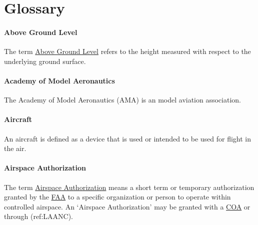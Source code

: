 \documentclass[
]{book}
\begin{document}
\hypertarget{glossary}{%
\chapter{Glossary}\label{glossary}}

\hypertarget{AGL}{%
\subsubsection*{Above Ground Level}\label{AGL}}

The term \protect\hyperlink{AGL}{Above Ground Level} refers to the height measured with respect to the underlying ground surface.





\hypertarget{AMA}{%
\subsubsection*{Academy of Model Aeronautics}\label{AMA}}

The Academy of Model Aeronautics (AMA) is an model aviation association.



\hypertarget{aircraft}{%
\subsubsection*{Aircraft}\label{aircraft}}

An aircraft is defined as a device that is used or intended to be used for flight in the air.



\hypertarget{AA}{%
\subsubsection*{Airspace Authorization}\label{AA}}

The term \protect\hyperlink{AA}{Airspace Authorization} means a short term or temporary authorization granted by the \protect\hyperlink{FAA}{FAA} to a specific organization or person to operate within controlled airspace. An `Airspace Authorization' may be granted with a \protect\hyperlink{COA}{COA} or through (ref:LAANC).
\end{document}
